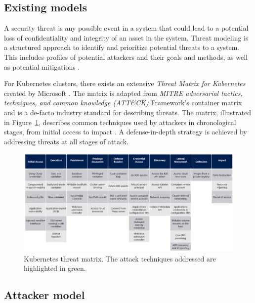 \documentclass[english, 12pt, a4paper, sci, utf8, a-2b, online]{aaltothesis}
\begin{document}
\subsection{Existing models}

A security threat is any possible event in a system that could lead to a potential loss of confidentiality and integrity of an asset in the system.
Threat modeling is a structured approach to identify and prioritize potential threats to a system.
This includes profiles of potential attackers and their goals and methods, as well as potential mitigations \cite{shevchenko2018threat}.

For Kubernetes clusters, there exists an extensive \emph{Threat Matrix for Kubernetes} created by Microsoft \cite{k8s-threat-matrix}.
The matrix is adapted from \emph{MITRE adversarial tactics, techniques, and common knowledge (ATT\&CK)} Framework's container matrix \cite{mitre-matrix} and is a de-facto industry standard for describing threats.
The matrix, illustrated in Figure~\ref{fig:threat-matrix}, describes common techniques used by attackers in chronological stages, from initial access to impact \cite{minna2021understanding}.
A defense-in-depth strategy is achieved by addressing threats at all stages of attack.

\begin{figure}[h!]
  \centering
  \includegraphics[width=\linewidth]{files/Matrix.png}
  \caption{Kubernetes threat matrix. The attack techniques addressed are highlighted in green.}
  \label{fig:threat-matrix}
\end{figure}

\subsection{Attacker model}
\end{document}
